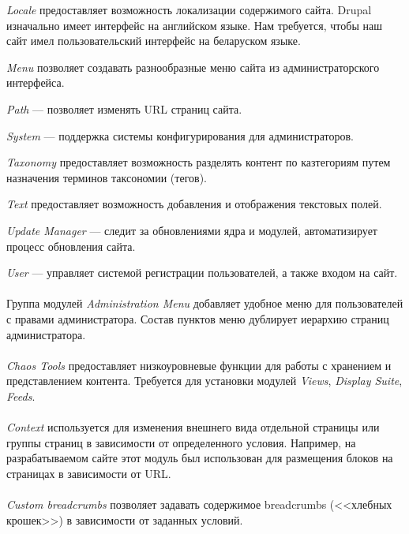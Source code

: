 \textit{Locale} предоставляет возможность локализации содержимого сайта.
Drupal изначально имеет интерфейс на английском языке. 
Нам требуется, чтобы наш сайт имел пользовательский интерфейс на беларуском языке.

\textit{Menu} позволяет создавать разнообразные меню сайта из администраторского интерфейса.

\textit{Path} --- позволяет изменять URL страниц сайта.

\textit{System} --- поддержка системы конфигурирования для администраторов.

\textit{Taxonomy} предоставляет возможность разделять контент по казтегориям 
путем назначения терминов таксономии (тегов).

\textit{Text} предоставляет возможность добавления и отображения текстовых полей.

\textit{Update Manager} --- следит за обновлениями ядра и модулей,
автоматизирует процесс обновления сайта.

\textit{User} --- управляет системой регистрации пользователей, а также входом на сайт.

\paragraph{}
Группа модулей \textit{Administration Menu} добавляет удобное меню для пользователей 
с правами администратора. Состав пунктов меню дублирует иерархию страниц администратора.

\paragraph{}
\textit{Chaos Tools} предоставляет низкоуровневые функции для работы с хранением и 
представлением контента. Требуется для установки модулей \textit{Views},
\textit{Display Suite}, \textit{Feeds}.

\paragraph{}
\textit{Context} используется для изменения внешнего вида отдельной страницы или 
группы страниц в зависимости от определенного условия.
Например, на разрабатываемом сайте этот модуль был использован для размещения блоков
на страницах в зависимости от URL.
  
\paragraph{}
\textit{Custom breadcrumbs} позволяет задавать содержимое breadcrumbs (<<хлебных крошек>>) 
в зависимости от заданных условий.

